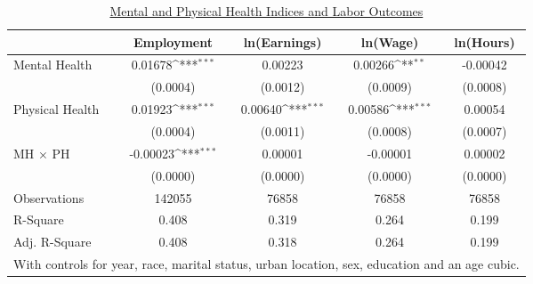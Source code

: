 \def\sym#1{\ifmmode^{#1}\else\(^{#1}\)\fi}
\begin{table}
\center\caption*{\large{\underline{Mental and Physical Health Indices and Labor Outcomes}}}
\vspace{0.2cm}
\begin{tabular}{l*{4}{c}}
                    &\multicolumn{1}{c}{Employment}&\multicolumn{1}{c}{ln(Earnings)}&\multicolumn{1}{c}{ln(Wage)}&\multicolumn{1}{c}{ln(Hours)}\\
\midrule
Mental Health       &     0.01678\sym{***}&     0.00223         &     0.00266\sym{**} &    -0.00042         \\
                    &    (0.0004)         &    (0.0012)         &    (0.0009)         &    (0.0008)         \\
Physical Health     &     0.01923\sym{***}&     0.00640\sym{***}&     0.00586\sym{***}&     0.00054         \\
                    &    (0.0004)         &    (0.0011)         &    (0.0008)         &    (0.0007)         \\
MH $\times$ PH      &    -0.00023\sym{***}&     0.00001         &    -0.00001         &     0.00002         \\
                    &    (0.0000)         &    (0.0000)         &    (0.0000)         &    (0.0000)         \\
\midrule
Observations        &      142055         &       76858         &       76858         &       76858         \\
R-Square            &       0.408         &       0.319         &       0.264         &       0.199         \\
Adj. R-Square       &       0.408         &       0.318         &       0.264         &       0.199         \\
\bottomrule
\multicolumn{5}{l}{\scriptsize{With controls for year, race, marital status, urban location, sex, education and an age cubic.}} \\
\end{tabular}
\end{table}
